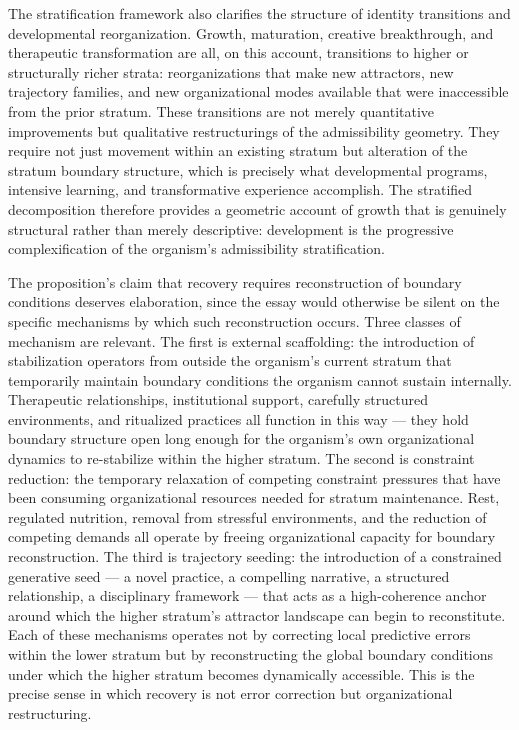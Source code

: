 \documentclass[12pt,a4paper]{report}
\theoremstyle{flyxion}
\begin{document}
The stratification framework also clarifies the structure of identity transitions and developmental reorganization. Growth, maturation, creative breakthrough, and therapeutic transformation are all, on this account, transitions to higher or structurally richer strata: reorganizations that make new attractors, new trajectory families, and new organizational modes available that were inaccessible from the prior stratum. These transitions are not merely quantitative improvements but qualitative restructurings of the admissibility geometry. They require not just movement within an existing stratum but alteration of the stratum boundary structure, which is precisely what developmental programs, intensive learning, and transformative experience accomplish. The stratified decomposition therefore provides a geometric account of growth that is genuinely structural rather than merely descriptive: development is the progressive complexification of the organism's admissibility stratification.

The proposition's claim that recovery requires reconstruction of boundary conditions deserves elaboration, since the essay would otherwise be silent on the specific mechanisms by which such reconstruction occurs. Three classes of mechanism are relevant. The first is external scaffolding: the introduction of stabilization operators from outside the organism's current stratum that temporarily maintain boundary conditions the organism cannot sustain internally. Therapeutic relationships, institutional support, carefully structured environments, and ritualized practices all function in this way --- they hold boundary structure open long enough for the organism's own organizational dynamics to re-stabilize within the higher stratum. The second is constraint reduction: the temporary relaxation of competing constraint pressures that have been consuming organizational resources needed for stratum maintenance. Rest, regulated nutrition, removal from stressful environments, and the reduction of competing demands all operate by freeing organizational capacity for boundary reconstruction. The third is trajectory seeding: the introduction of a constrained generative seed --- a novel practice, a compelling narrative, a structured relationship, a disciplinary framework --- that acts as a high-coherence anchor around which the higher stratum's attractor landscape can begin to reconstitute. Each of these mechanisms operates not by correcting local predictive errors within the lower stratum but by reconstructing the global boundary conditions under which the higher stratum becomes dynamically accessible. This is the precise sense in which recovery is not error correction but organizational restructuring.
\end{document}
